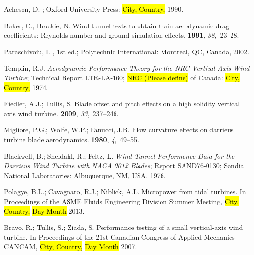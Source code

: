 \documentclass[energies,article,accept,moreauthors,pdftex,10pt,a4paper]{mdpi}
\theoremstyle{mdpi}
\newcounter{ex}
\newcounter{re}
\begin{document}
\begin{thebibliography}{999}
\providecommand{\natexlab}[1]{#1}

Acheson, D.
; Oxford University Press: \hl{City, Country,} 1990.

Baker, C.; Brockie, N.
\newblock Wind tunnel tests to obtain train aerodynamic drag coefficients:
 {R}eynolds number and ground simulation effects.
 {\bf
 1991}, {\em 38},~23--28.

Paraschivoiu, I.
, 1st ed.;
 Polytechnic International: Montreal, QC, Canada, 2002.

Templin, R.J.
\newblock \emph{Aerodynamic Performance Theory for the NRC Vertical Axis Wind
 Turbine};
\newblock Technical Report LTR-LA-160; \hl {NRC (Please define)} of Canada: \hl{City, Country,} 1974.

Fiedler, A.J.; Tullis, S.
\newblock Blade offset and pitch effects on a high solidity vertical axis wind
 turbine.
 {\bf 2009}, {\em 33},~237--246.

Migliore, P.G.; Wolfe, W.P.; Fanucci, J.B.
\newblock Flow curvature effects on {d}arrieus turbine blade aerodynamics.
 {\bf 1980}, {\em 4},~49--55.

Blackwell, B.; Sheldahl, R.; Feltz, L.
\newblock \emph{Wind Tunnel Performance Data for the {Darrieus} Wind Turbine with
 {NACA} 0012 Blades};
\newblock Report SAND76-0130; Sandia National Laboratories: Albuquerque, NM, USA,
 1976.

Polagye, B.L.; Cavagnaro, R.J.; Niblick, A.L.
\newblock Micropower from tidal turbines.
\newblock In Proceedings of the ASME Fluids Engineering Division Summer Meeting, \hl{City, Country,} \hl{Day Month} 2013.

Bravo, R.; Tullis, S.; Ziada, S.
\newblock Performance testing of a small vertical-axis wind turbine.
\newblock In Proceedings of the 21st Canadian Congress of Applied Mechanics
 CANCAM, \hl{City, Country,} \hl{Day Month} 2007.


\end{thebibliography}
\end{document}
